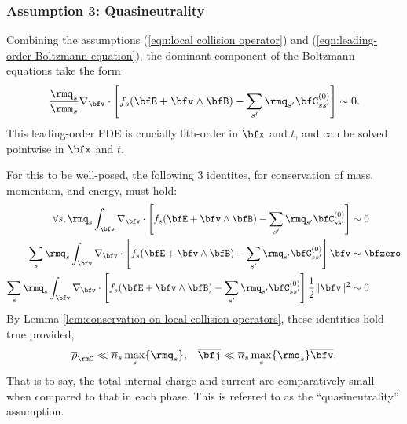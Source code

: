 \subsubsection*{Assumption 3: Quasineutrality}
    Combining the assumptions (\ref{eqn:local collision operator}) and (\ref{eqn:leading-order Boltzmann equation}), the dominant component of the Boltzmann equations take the form
    \begin{equation}\label{eqn:local leading-order Boltzmann equation}
        \frac{\rmq_{s}}{\rmm_{s}}\nabla_{\bfv}\cdot\left[f_{s}(\bfE + \bfv\wedge\bfB) - \sum_{s'}\rmq_{s'}\bfC_{ss'}^{(0)}\right]  \sim  0.
    \end{equation}
    This leading-order PDE is crucially 0th-order in $\bfx$ and $t$, and can be solved pointwise in $\bfx$ and $t$.
    
    For this to be well-posed, the following 3 identites, for conservation of mass, momentum, and energy, must hold:
    \begin{align}
        \forall s,  \rmq_{s}\int_{\bfv}\nabla_{\bfv}\cdot\left[f_{s}(\bfE + \bfv\wedge\bfB) - \sum_{s'}\rmq_{s'}\bfC_{ss'}^{(0)}\right]  &\sim  0  \\
        \sum_{s}\rmq_{s}\int_{\bfv}\nabla_{\bfv}\cdot\left[f_{s}(\bfE + \bfv\wedge\bfB) - \sum_{s'}\rmq_{s'}\bfC_{ss'}^{(0)}\right]\bfv  &\sim  \bfzero  \\
        \sum_{s}\rmq_{s}\int_{\bfv}\nabla_{\bfv}\cdot\left[f_{s}(\bfE + \bfv\wedge\bfB) - \sum_{s'}\rmq_{s'}\bfC_{ss'}^{(0)}\right]\frac{1}{2}\|\bfv\|^{2}  &\sim  0
    \end{align}
    By Lemma \ref{lem:conservation on local collision operators}, these identities hold true provided,
    \begin{align}
        \overline{\rho}_{\rmC}  \ll \overline{n}_{s}\max_{s}\{\rmq_{s}\},  &&
        \overline{\bfj}         \ll  \overline{n}_{s}\max_{s}\{\rmq_{s}\}\overline{\bfv}.
    \end{align}
    That is to say, the total internal charge and current are comparatively small when compared to that in each phase. This is referred to as the ``quasineutrality'' assumption.
    